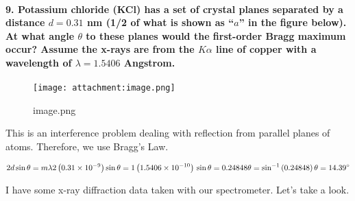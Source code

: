 \documentclass[11pt]{article}
\makeatletter
\def\maxwidth{\ifdim\Gin@nat@width>\linewidth\linewidth
    \else\Gin@nat@width\fi}
\let\Oldincludegraphics\includegraphics
\renewcommand{\includegraphics}[1]{\Oldincludegraphics[width=.8\maxwidth]{#1}}
\makeatother
\begin{document}
    \paragraph{\texorpdfstring{9. Potassium chloride (KCl) has a set of
crystal planes separated by a distance \(d=0.31\) nm (1/2 of what is
shown as ``\(a\)'' in the figure below). At what angle \(\theta\) to
these planes would the first-order Bragg maximum occur? Assume the
x-rays are from the \(K\alpha\) line of copper with a wavelength of
\(\lambda=1.5406\)
Angstrom.}{9. Potassium chloride (KCl) has a set of crystal planes separated by a distance d=0.31 nm (1/2 of what is shown as ``a'' in the figure below). At what angle \textbackslash{}theta to these planes would the first-order Bragg maximum occur? Assume the x-rays are from the K\textbackslash{}alpha line of copper with a wavelength of \textbackslash{}lambda=1.5406 Angstrom.}}\label{potassium-chloride-kcl-has-a-set-of-crystal-planes-separated-by-a-distance-d0.31-nm-12-of-what-is-shown-as-a-in-the-figure-below.-at-what-angle-theta-to-these-planes-would-the-first-order-bragg-maximum-occur-assume-the-x-rays-are-from-the-kalpha-line-of-copper-with-a-wavelength-of-lambda1.5406-angstrom.}

\begin{figure}[htbp]
\centering
\texttt{[image: attachment:image.png]}
\caption{image.png}
\end{figure}

This is an interference problem dealing with reflection from parallel
planes of atoms. Therefore, we use Bragg's Law.

\[\begin{equation}
2 d\sin\theta = m\lambda\\
\\
2\left(0.31\times10^{-9}\right)\sin\theta=1\left(1.5406\times10^{-10}\right)\\
\\
\sin\theta = 0.24848\\
\\
\theta = \sin^{-1}\left(0.24848\right)\\
\\
\theta = 14.39^{\circ}
\end{equation}\]

I have some x-ray diffraction data taken with our spectrometer. Let's
take a look.
\end{document}
